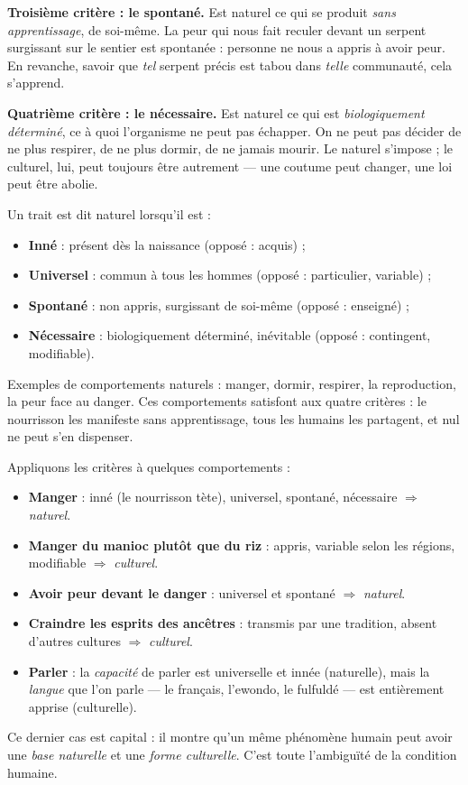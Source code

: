 \documentclass[11pt]{article}
\newcommand{\cle}[1]{{\popxbold\color{popdark}#1}}
\begin{document}
\textbf{Troisième critère : le spontané.} Est naturel ce qui se produit \emph{sans apprentissage}, de soi-même. La peur qui nous fait reculer devant un serpent surgissant sur le sentier est spontanée : personne ne nous a appris à avoir peur. En revanche, savoir que \emph{tel} serpent précis est tabou dans \emph{telle} communauté, cela s'apprend.

\textbf{Quatrième critère : le nécessaire.} Est naturel ce qui est \emph{biologiquement déterminé}, ce à quoi l'organisme ne peut pas échapper. On ne peut pas décider de ne plus respirer, de ne plus dormir, de ne jamais mourir. Le naturel s'impose ; le culturel, lui, peut toujours être autrement --- une coutume peut changer, une loi peut être abolie.

\begin{aretenir}
Un trait est dit \cle{naturel} lorsqu'il est :
\begin{itemize}
\item \textbf{Inné} : présent dès la naissance (opposé : acquis) ;
\item \textbf{Universel} : commun à tous les hommes (opposé : particulier, variable) ;
\item \textbf{Spontané} : non appris, surgissant de soi-même (opposé : enseigné) ;
\item \textbf{Nécessaire} : biologiquement déterminé, inévitable (opposé : contingent, modifiable).
\end{itemize}
Exemples de comportements naturels : manger, dormir, respirer, la reproduction, la peur face au danger. Ces comportements satisfont aux quatre critères : le nourrisson les manifeste sans apprentissage, tous les humains les partagent, et nul ne peut s'en dispenser.
\end{aretenir}

\begin{exemplebox}
Appliquons les critères à quelques comportements :
\begin{itemize}
\item \textbf{Manger} : inné (le nourrisson tète), universel, spontané, nécessaire $\Rightarrow$ \emph{naturel}.
\item \textbf{Manger du manioc plutôt que du riz} : appris, variable selon les régions, modifiable $\Rightarrow$ \emph{culturel}.
\item \textbf{Avoir peur devant le danger} : universel et spontané $\Rightarrow$ \emph{naturel}.
\item \textbf{Craindre les esprits des ancêtres} : transmis par une tradition, absent d'autres cultures $\Rightarrow$ \emph{culturel}.
\item \textbf{Parler} : la \emph{capacité} de parler est universelle et innée (naturelle), mais la \emph{langue} que l'on parle --- le français, l'ewondo, le fulfuldé --- est entièrement apprise (culturelle).
\end{itemize}
Ce dernier cas est capital : il montre qu'un même phénomène humain peut avoir une \emph{base naturelle} et une \emph{forme culturelle}. C'est toute l'ambiguïté de la condition humaine.
\end{exemplebox}
\end{document}

